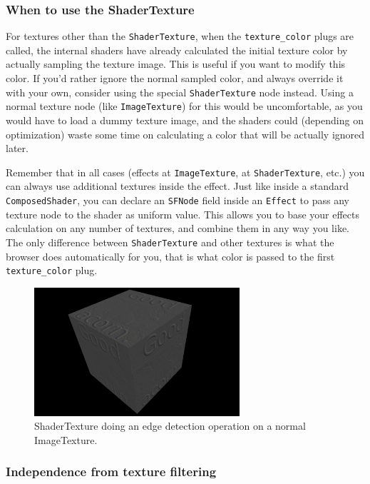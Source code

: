 \documentclass{acmsiggraph}                     %
\begin{document}
\subsubsection{When to use the ShaderTexture}

For textures other than the \texttt{ShaderTexture},
when the \texttt{texture\_color} plugs are called,
the internal shaders have already calculated the initial texture
color by actually sampling the texture image. This is useful if you
want to modify this color. If you'd rather ignore the normal
sampled color, and always override it with your own, consider using
the special \texttt{ShaderTexture} node instead. Using
a normal texture node (like \texttt{ImageTexture}) for this
would be uncomfortable, as you would have to load a dummy texture image,
and the shaders could (depending on optimization) waste some time
on calculating a color that will be actually ignored later.

Remember that in all cases (effects at \texttt{ImageTexture},
at \texttt{ShaderTexture}, etc.) you can always use additional
textures inside the effect. Just like inside a standard \texttt{ComposedShader},
you can declare an \texttt{SFNode} field inside an \texttt{Effect}
to pass any texture node to the shader as uniform value.
This allows you to base your effects calculation on any number of textures,
and combine them in any way you like. The only difference
between \texttt{ShaderTexture} and other textures is what the browser
does automatically for you, that is what color is passed
to the first \texttt{texture\_color} plug.

\begin{figure}[H]
  \centering
  \includegraphics[width=3in]{shader_texture_edge_detection}
  \caption{ShaderTexture doing an edge detection operation on a normal ImageTexture.}
\end{figure}

\subsubsection{Independence from texture filtering}
\end{document}
